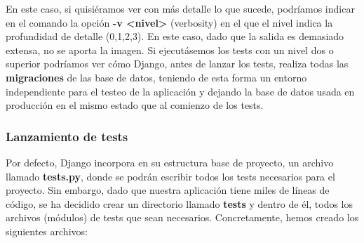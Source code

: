 En este caso, si quisiéramos ver con más detalle lo que sucede, podríamos indicar en el
comando la opción \textbf{-v <nivel>} (verbosity) en el que el nivel indica la profundidad
de detalle (0,1,2,3). En este caso, dado que la salida es demasiado extensa, no se aporta
la imagen. Si ejecutásemos los tests con un nivel dos o superior podríamos ver cómo Django,
antes de lanzar los tests, realiza todas las \textbf{migraciones} de las base de datos,
teniendo de esta forma un entorno independiente para el testeo de la aplicación y dejando
la base de datos usada en producción en el mismo estado que al comienzo de los tests.\\

\subsubsection{Lanzamiento de tests}
Por defecto, Django incorpora en su estructura base de proyecto, un archivo llamado
\textbf{tests.py}, donde se podrán escribir todos los tests necesarios para el proyecto.
Sin embargo, dado que nuestra aplicación tiene miles de líneas de código, se ha decidido
crear un directorio llamado \textbf{tests} y dentro de él, todos los archivos (módulos) de
tests que sean necesarios. Concretamente, hemos creado los siguientes archivos:

